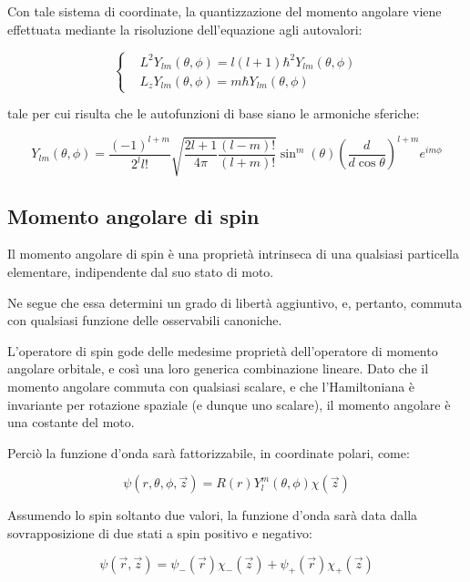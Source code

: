 \documentclass{article}
\begin{document}
Con tale sistema di coordinate, la quantizzazione del momento angolare viene effettuata mediante la risoluzione dell'equazione agli autovalori:

\begin{equation}
  \left\{
  \begin{aligned}
     & L^2Y_{lm}(\theta, \phi)=l(l+1)\hbar^2Y_{lm}(\theta, \phi) \\
     & L_zY_{lm}(\theta, \phi)=m\hbar Y_{lm}(\theta, \phi)
  \end{aligned}
  \right.
\end{equation}

tale per cui risulta che le autofunzioni di base siano le armoniche sferiche:

\begin{equation}
  Y_{lm}(\theta, \phi) = \frac{(-1)^{l+m}}{2^l l!} \sqrt{\frac{2l+1}{4\pi} \frac{(l-m)!}{(l+m)!}} \sin^m(\theta) \left( \frac{d}{d\cos{\theta}} \right)^{l+m} e^{im\phi}
\end{equation}

\subsection{Momento angolare di spin}
Il momento angolare di spin è una proprietà intrinseca di una qualsiasi particella elementare, indipendente dal suo stato di moto.

Ne segue che essa determini un grado di libertà aggiuntivo, e, pertanto, commuta con qualsiasi funzione delle osservabili canoniche.

L'operatore di spin gode delle medesime proprietà dell'operatore di momento angolare orbitale, e così una loro generica combinazione lineare.
Dato che il momento angolare commuta con qualsiasi scalare, e che l'Hamiltoniana è invariante per rotazione spaziale (e dunque uno scalare), il momento angolare è una costante del moto.

Perciò la funzione d'onda sarà fattorizzabile, in coordinate polari, come:

\begin{equation}
  \psi(r,\theta, \phi,\vec{z})=R(r)Y^m_l(\theta, \phi) \chi(\vec{z})
\end{equation}

Assumendo lo spin soltanto due valori, la funzione d'onda sarà data dalla sovrapposizione di due stati a spin positivo e negativo:

\begin{equation}
  \psi(\vec{r},\vec{z})=\psi_-(\vec{r})\chi_-(\vec{z}) + \psi_+(\vec{r})\chi_+(\vec{z})
\end{equation}
\end{document}
